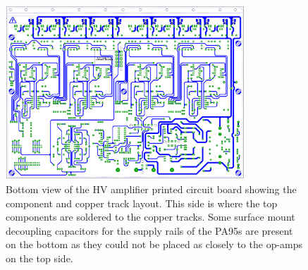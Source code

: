 \begin{figure}
  \centering
  \includegraphics[width=0.8\textwidth]{graphics/60-hv-amp-bottom.pdf}
  \caption[High voltage amplifier board, bottom view]{\label{fig:hv-amp-bottom}Bottom view of the \gls{HV} amplifier printed circuit board showing the component and copper track layout. This side is where the top components are soldered to the copper tracks. Some surface mount decoupling capacitors for the supply rails of the PA95s are present on the bottom as they could not be placed as closely to the op-amps on the top side.}
\end{figure}